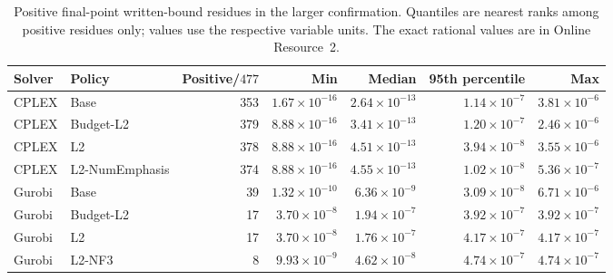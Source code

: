 \begin{table}[htbp]
\centering\small\setlength{\tabcolsep}{4pt}
\caption{Positive final-point written-bound residues in the larger confirmation.
Quantiles are nearest ranks among positive residues only; values use the
respective variable units. The exact rational values are in Online Resource~2.}
\label{tab:orf-large-bound-magnitudes}
\begin{tabular}{llrrrrr}\toprule
Solver & Policy & Positive/$477$ & Min & Median & 95th percentile & Max\\\midrule
CPLEX & Base & 353 & $1.67\!\times\!10^{-16}$ & $2.64\!\times\!10^{-13}$ & $1.14\!\times\!10^{-7}$ & $3.81\!\times\!10^{-6}$\\
CPLEX & Budget-L2 & 379 & $8.88\!\times\!10^{-16}$ & $3.41\!\times\!10^{-13}$ & $1.20\!\times\!10^{-7}$ & $2.46\!\times\!10^{-6}$\\
CPLEX & L2 & 378 & $8.88\!\times\!10^{-16}$ & $4.51\!\times\!10^{-13}$ & $3.94\!\times\!10^{-8}$ & $3.55\!\times\!10^{-6}$\\
CPLEX & L2-NumEmphasis & 374 & $8.88\!\times\!10^{-16}$ & $4.55\!\times\!10^{-13}$ & $1.02\!\times\!10^{-8}$ & $5.36\!\times\!10^{-7}$\\
Gurobi & Base & 39 & $1.32\!\times\!10^{-10}$ & $6.36\!\times\!10^{-9}$ & $3.09\!\times\!10^{-8}$ & $6.71\!\times\!10^{-6}$\\
Gurobi & Budget-L2 & 17 & $3.70\!\times\!10^{-8}$ & $1.94\!\times\!10^{-7}$ & $3.92\!\times\!10^{-7}$ & $3.92\!\times\!10^{-7}$\\
Gurobi & L2 & 17 & $3.70\!\times\!10^{-8}$ & $1.76\!\times\!10^{-7}$ & $4.17\!\times\!10^{-7}$ & $4.17\!\times\!10^{-7}$\\
Gurobi & L2-NF3 & 8 & $9.93\!\times\!10^{-9}$ & $4.62\!\times\!10^{-8}$ & $4.74\!\times\!10^{-7}$ & $4.74\!\times\!10^{-7}$\\
\bottomrule\end{tabular}\end{table}
